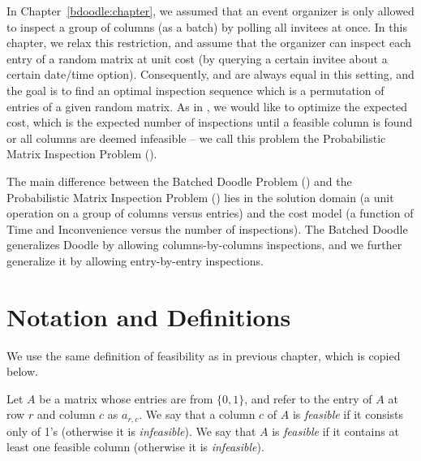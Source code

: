 \label{matrix:chapter}

In Chapter~\ref{bdoodle:chapter}, we assumed that an event organizer is only allowed to inspect a group of columns (as a batch) by polling all invitees at once.
In this chapter, we relax this restriction, and assume that the organizer can inspect each entry of a random matrix at unit cost (by querying a certain invitee about a certain date/time option). 
Consequently, \Time and \Inconvenience are always equal in this setting, and the goal is to find an optimal inspection sequence which is a permutation of entries of a given random matrix.
As in \BDP, we would like to optimize the expected cost, which is the expected number of inspections until a feasible column is found or all columns are deemed infeasible -- we call this problem the Probabilistic Matrix Inspection Problem (\PMIP). 


The main difference between the Batched Doodle Problem (\BDP) and the Probabilistic Matrix Inspection Problem (\PMIP) lies in the solution domain (a unit operation on a group of columns versus entries) and the cost model (a function of Time and Inconvenience versus the number of inspections). 
The Batched Doodle generalizes Doodle by allowing columns-by-columns inspections, and we further generalize it by allowing entry-by-entry inspections. 


\section{Notation and Definitions} \label{matrix:sec:notation}

  We use the same definition of feasibility as in previous chapter, which is copied below. 

 \begin{definition}[Feasibility]
 Let $A$ be a matrix whose entries are from $\{0,1\}$, and refer to the entry of $A$ at row $r$ and column $c$ as $a_{r,c}$.
 We say that a column $c$ of $A$ is {\em feasible} if it consists only of 1's (otherwise it is {\em infeasible}). 
 We say that $A$ is {\em feasible} if it contains at least one feasible column (otherwise it is {\em infeasible}).
 \end{definition}

